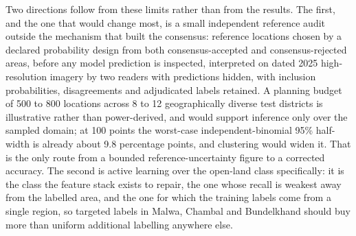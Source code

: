 \documentclass[conference]{IEEEtran}
\begin{document}
Two directions follow from these limits rather than from the results. The first, and the one that would change most, is a small independent reference audit outside the mechanism that built the consensus: reference locations chosen by a declared probability design from both consensus-accepted and consensus-rejected areas, before any model prediction is inspected, interpreted on dated 2025 high-resolution imagery by two readers with predictions hidden, with inclusion probabilities, disagreements and adjudicated labels retained. A planning budget of 500 to 800 locations across 8 to 12 geographically diverse test districts is illustrative rather than power-derived, and would support inference only over the sampled domain; at 100 points the worst-case independent-binomial 95\% half-width is already about 9.8 percentage points, and clustering would widen it. That is the only route from a bounded reference-uncertainty figure to a corrected accuracy. The second is active learning over the open-land class specifically: it is the class the feature stack exists to repair, the one whose recall is weakest away from the labelled area, and the one for which the training labels come from a single region, so targeted labels in Malwa, Chambal and Bundelkhand should buy more than uniform additional labelling anywhere else.

\FloatBarrier
\end{document}
